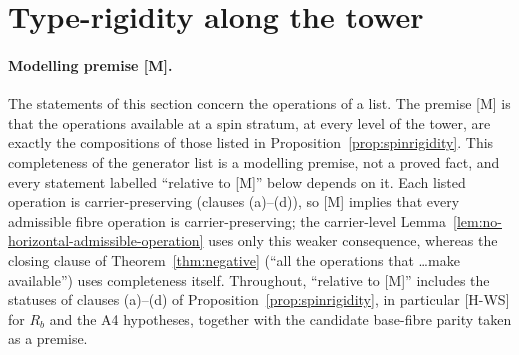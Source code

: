 \documentclass[11pt]{article}
\theoremstyle{definition}
\theoremstyle{remark}
\begin{document}
  \section{Type-rigidity along the tower}
    \label{sec:rigidity}

    \paragraph{Modelling premise [M].}
    The statements of this section concern the operations of a list.
    The premise [M] is that the operations available at a spin stratum, at every level of the tower, are exactly the
    compositions of those listed in Proposition~\ref{prop:spinrigidity}.
    This completeness of the generator list is a modelling premise, not a proved fact, and every statement labelled
    ``relative to [M]'' below depends on it.
    Each listed operation is carrier-preserving (clauses (a)--(d)), so [M] implies that every admissible fibre
    operation is carrier-preserving; the carrier-level Lemma~\ref{lem:no-horizontal-admissible-operation} uses only
    this weaker consequence, whereas the closing clause of Theorem~\ref{thm:negative} (``all the operations that
    \dots make available'') uses completeness itself.
    Throughout, ``relative to [M]'' includes the statuses of clauses (a)--(d) of
    Proposition~\ref{prop:spinrigidity}, in particular [H-WS] for $R_b$ and the A4 hypotheses, together with the
    candidate base-fibre parity taken as a premise.
\end{document}
